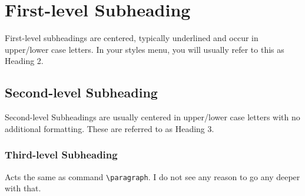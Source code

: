 \section{First-level Subheading}

First-level subheadings are centered, typically underlined and occur in upper/lower case letters. In your styles menu, you will usually refer to this as Heading 2.

\subsection{Second-level Subheading}

Second-level Subheadings are usually centered in upper/lower case letters with no additional formatting. These are referred to as Heading 3.

\subsubsection{Third-level Subheading} Acts the same as command \verb|\paragraph|. I do not see any reason to go any deeper with that.

